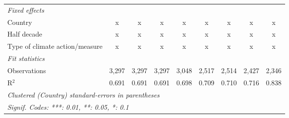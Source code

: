 \begin{table}[htbp]
\begin{tabular}{lcccccccc}
      \emph{Fixed effects}\\
      Country                                                                  & x       & x       & x           & x           & x             & x             & x              & x\\  
      Half decade                                                              & x       & x       & x           & x           & x             & x             & x              & x\\  
      Type of climate action/measure                                           & x       & x       & x           & x           & x             & x             & x              & x\\  
      \midrule \emph{Fit statistics}\\
      Observations                                                             & 3,297   & 3,297   & 3,297       & 3,048       & 2,517         & 2,514         & 2,427          & 2,346\\  
      R$^2$                                                                    & 0.691   & 0.691   & 0.691       & 0.698       & 0.709         & 0.710         & 0.716          & 0.838\\  
      \midrule
      \multicolumn{9}{l}{\emph{Clustered (Country) standard-errors in parentheses}}\\
      \multicolumn{9}{l}{\emph{Signif. Codes: ***: 0.01, **: 0.05, *: 0.1}}\\
   \end{tabular}
\end{table}


